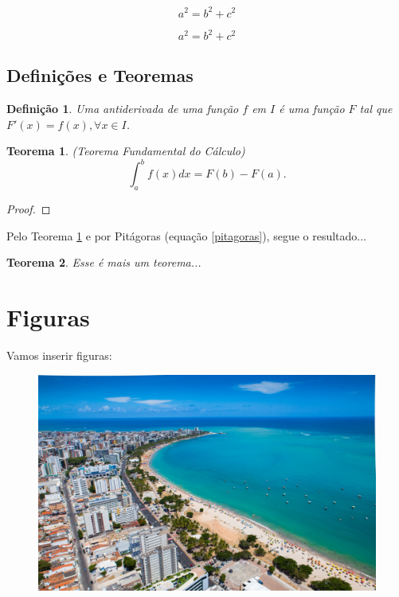 \documentclass{abntex2}
\newtheorem{definicao}{Definição}[section]  %
\newtheorem{teorema}{Teorema}[chapter]  %
\begin{document}
$$a^2=b^2+c^2$$

\begin{equation}
	a^2=b^2+c^2
	\label{pitagoras}
\end{equation}

\section{Definições e Teoremas}
\begin{definicao}
	Uma antiderivada de uma função $f$ em $I$ é uma função $F$ tal que $F'(x)=f(x),\forall x\in I$.
\end{definicao}

\begin{teorema}(Teorema Fundamental do Cálculo)
	\[\int_a^b f(x) dx = F(b)-F(a).\]
	\label{tfc}
\end{teorema}
\begin{proof}
	\lipsum[1]
\end{proof}

Pelo Teorema \ref{tfc} e por Pitágoras (equação \ref{pitagoras}), segue o resultado... 

\begin{teorema}
	Esse é mais um teorema...
\end{teorema}

\chapter{Figuras}
Vamos inserir figuras:
\begin{figure}[h]
	\includegraphics[scale=0.1]{maceio.jpg}
\end{figure}
\end{document}
